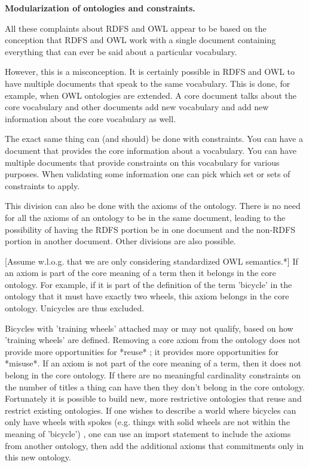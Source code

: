 \documentclass{llncs}
\begin{document}
\textbf{Modularization of ontologies and constraints.}

All these complaints about RDFS and OWL appear to be based on the conception 
that RDFS and OWL work with a single document containing everything that can 
ever be said about a particular vocabulary.

However, this is a misconception.  It is certainly possible in RDFS and OWL to 
have multiple documents that speak to the same vocabulary.  This is done, for 
example, when OWL ontologies are extended.  A core document talks about the 
core vocabulary and other documents add new vocabulary and add new information 
about the core vocabulary as well.

The exact same thing can (and should) be done with constraints.  You can have 
a document that provides the core information about a vocabulary.  You can 
have multiple documents that provide constraints on this vocabulary for 
various purposes.  When validating some information one can pick which set or 
sets of constraints to apply.

This division can also be done with the axioms of the ontology.  There is no 
need for all the axioms of an ontology to be in the same document, leading to 
the possibility of having the RDFS portion be in one document and the non-RDFS 
portion in another document.  Other divisions are also possible.

[Assume w.l.o.g. that we are only considering standardized OWL semantics.*]
If an axiom is part of the core meaning of a term then it belongs in the core  ontology.  For example, if it is part of the definition of the term  'bicycle' in the ontology that it must have exactly two wheels, this axiom belongs in the core ontology. Unicycles are thus excluded.  

Bicycles with 'training wheels' attached may or may not qualify, based on how 'training wheels' are defined.  
Removing a core axiom from the ontology does not provide more opportunities for *reuse* ; it provides more opportunities for *misuse*.
If an axiom is not part of the core meaning of a term, then it does not belong in the core ontology.  If there are no meaningful cardinality constraints on the number of titles a thing can have then they don't belong in the core ontology.
Fortunately it is possible to build new, more restrictive ontologies that reuse and restrict existing ontologies. If one wishes to describe a world where bicycles can only have wheels with spokes (e.g.  things with solid wheels are not within the meaning of 'bicycle') , one can use an import statement to include the axioms from another ontology, then add the additional axioms that commitments only in this new ontology.
\end{document}
